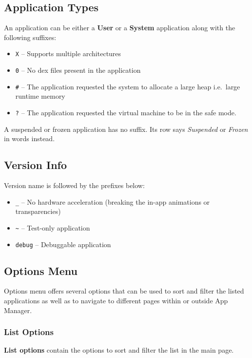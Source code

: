 \subsection{Application Types}\label{subsec:main-page-application-types} %
An application can be either a \textbf{User} or a \textbf{System} application along with the following suffixes:
\begin{itemize}
    \item \texttt{X} -- Supports multiple architectures
    \item \texttt{0} -- No dex files present in the application
    \item \texttt{\#} -- The application requested the system to allocate a large heap i.e.\ large runtime memory
    \item \texttt{?} -- The application requested the virtual machine to be in the safe mode.
\end{itemize}
A suspended or frozen application has no suffix. Its row says \textit{Suspended} or \textit{Frozen} in words instead.

\subsection{Version Info}\label{subsec:main-page-version-info} %
Version name is followed by the prefixes below:
\begin{itemize}
    \item \texttt{\_} -- No hardware acceleration (breaking the in-app animations or transparencies)
    \item \texttt{\textasciitilde} -- Test-only application
    \item \texttt{debug} -- Debuggable application
\end{itemize}

\subsection{Options Menu}\label{subsec:main-page-options-menu} %
Options menu offers several options that can be used to sort and filter the listed applications as well as to navigate
to different pages within or outside App Manager.

\subsubsection{List Options}\label{subsubsec:main-list-options} %
\textbf{List options} contain the options to sort and filter the list in the main page.

